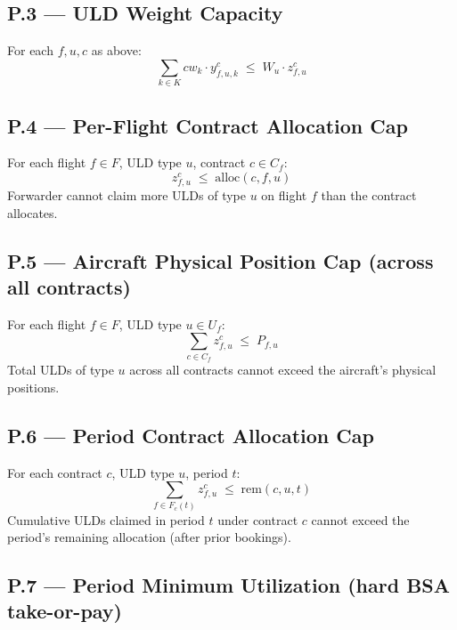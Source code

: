 \documentclass[11pt,a4paper]{article}
\theoremstyle{definition}
\begin{document}
\subsection*{P.3 — ULD Weight Capacity}

For each $f, u, c$ as above:
\begin{equation}
  \sum_{k \in K} cw_k \cdot y_{f,u,k}^c \;\leq\; W_u \cdot z_{f,u}^c
  \label{eq:P3}
\end{equation}

\subsection*{P.4 — Per-Flight Contract Allocation Cap}

For each flight $f \in F$, ULD type $u$, contract $c \in C_f$:
\begin{equation}
  z_{f,u}^c \;\leq\; \text{alloc}(c, f, u)
  \label{eq:P4}
\end{equation}
Forwarder cannot claim more ULDs of type $u$ on flight $f$ than the contract allocates.

\subsection*{P.5 — Aircraft Physical Position Cap (across all contracts)}

For each flight $f \in F$, ULD type $u \in U_f$:
\begin{equation}
  \sum_{c \in C_f} z_{f,u}^c \;\leq\; P_{f,u}
  \label{eq:P5}
\end{equation}
Total ULDs of type $u$ across all contracts cannot exceed the aircraft's physical positions.

\subsection*{P.6 — Period Contract Allocation Cap}

For each contract $c$, ULD type $u$, period $t$:
\begin{equation}
  \sum_{f \in F_c(t)} z_{f,u}^c \;\leq\; \text{rem}(c, u, t)
  \label{eq:P6}
\end{equation}
Cumulative ULDs claimed in period $t$ under contract $c$ cannot exceed the period's remaining
allocation (after prior bookings).

\subsection*{P.7 — Period Minimum Utilization (hard BSA take-or-pay)}
\end{document}
